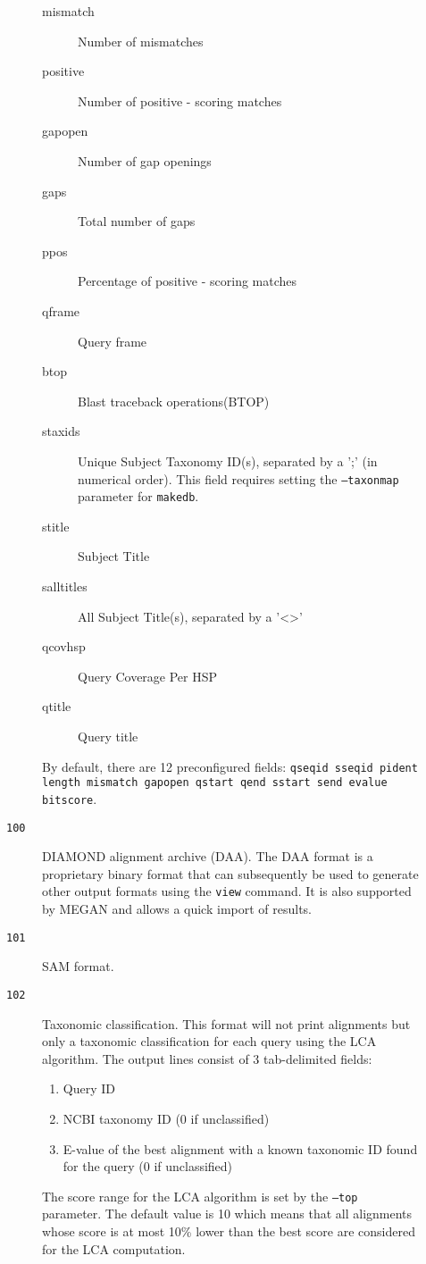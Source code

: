 \documentclass[11pt]{article}
\begin{document}
\begin{description}
\begin{description}
\begin{description}
\item[mismatch]Number of mismatches
\item[positive]Number of positive - scoring matches
\item[gapopen]Number of gap openings
\item[gaps]Total number of gaps
\item[ppos]Percentage of positive - scoring matches
\item[qframe]Query frame
\item[btop]Blast traceback operations(BTOP)
\item[staxids]Unique Subject Taxonomy ID(s), separated by a ';' (in numerical order). This field requires setting the \texttt{--taxonmap} parameter for \texttt{makedb}.
\item[stitle]Subject Title
\item[salltitles]All Subject Title(s), separated by a '\textless\textgreater'
\item[qcovhsp]Query Coverage Per HSP
\item[qtitle]Query title
\end{description}
By default, there are 12 preconfigured fields: \texttt{qseqid sseqid pident length mismatch gapopen qstart qend sstart send evalue bitscore}.
\item[\texttt{100}]DIAMOND alignment archive (DAA). The DAA format is a proprietary binary format that can subsequently be used to generate other output formats using the \texttt{view} command. It is also supported by MEGAN and allows a quick import of results.
\item[\texttt{101}]SAM format.
\item[\texttt{102}]Taxonomic classification. This format will not print alignments but only a taxonomic classification for each query using the LCA algorithm. The output lines consist of 3 tab-delimited fields:
\begin{enumerate}
\item Query ID
\item NCBI taxonomy ID (0 if unclassified)
\item E-value of the best alignment with a known taxonomic ID found for the query (0 if unclassified)
\end{enumerate}
The score range for the LCA algorithm is set by the \texttt{--top} parameter. The default value is 10 which means that all alignments whose score is at most 10\% lower than the best score are considered for the LCA computation.


\end{description}
\end{description}
\end{document}
